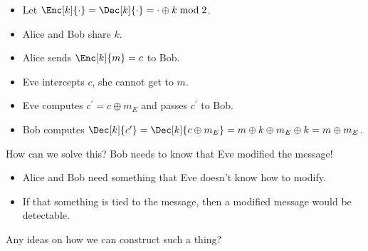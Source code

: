 \begin{frame}
  \begin{example}
    \begin{itemize}
      \item Let \(\Enc[k]{\cdot} = \Dec[k]{\cdot} = \cdot\oplus k\bmod 2\).
        
        \pause{}

      \item Alice and Bob share \(k\).
      \item Alice sends \(\Enc[k]{m} = c\) to Bob.

        \pause{}

      \item Eve intercepts \(c\), she cannot get to \(m\).

        \pause{}

      \item Eve computes \(c^\prime = c\oplus m_E\) and passes \(c^\prime\) to 
        Bob.

        \pause{}

      \item Bob computes \(\Dec[k]{c^\prime} = \Dec[k]{c\oplus m_E} = m\oplus 
          k\oplus m_E\oplus k = m\oplus m_E\).
    \end{itemize}
  \end{example}

  \pause{}
  
  \begin{exercise}
    How can we solve this?
    Bob needs to know that Eve modified the message!
  \end{exercise}
\end{frame}

\begin{frame}
  \begin{idea}
    \begin{itemize}
      \item Alice and Bob need something that Eve doesn't know how to modify.

        \pause{}

      \item If that something is tied to the message, then a modified message 
        would be detectable.
    \end{itemize}
  \end{idea}

  \pause{}

  \begin{exercise}
    Any ideas on how we can construct such a thing?
  \end{exercise}
\end{frame}

